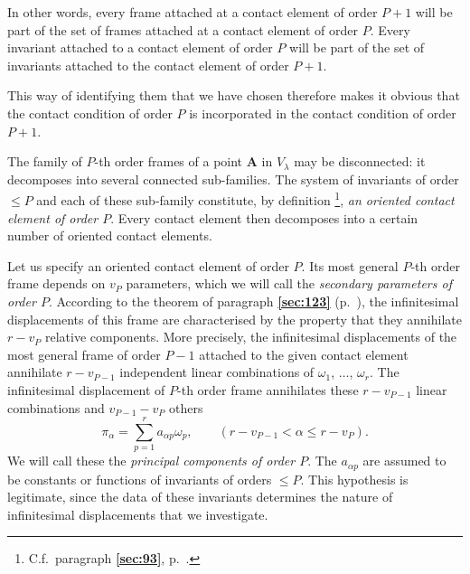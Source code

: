 \documentclass[leqno,11pt]{book}
\numberwithin{equation}{chapter}
\theoremstyle{shape1}
\theoremstyle{shapesmall}
\newcommand{\fsref}[1]{{\rm\textsection\textbf{\ref{sec:#1}}}}
\newcommand{\somespace}{\vspace{9pt}}
\begin{document}
\somespace

{\small
In other words, every frame attached at a contact element of order $P+1$ will be part of the set of frames attached at a contact element of order $P$. Every invariant attached to a contact element of order $P$ will be part of the set of invariants attached to the contact element of order $P+1$.

This way of identifying them that we have chosen therefore makes it obvious that the contact condition of order $P$ is incorporated in the contact condition of order $P+1$.
}

\somespace

The family of $P$-th order frames of a point $\mathbf{A}$ in $V_{\lambda}$ may be disconnected: it decomposes into several connected sub-families. The system of invariants of order $\le P$ and each of these sub-family constitute, by definition \footnote{C.f.~paragraph \fsref{93}, p.~\pageref{sec:93}.}, \emph{an oriented contact element of order $P$}. Every contact element then decomposes into a certain number of oriented contact elements.

Let us specify an oriented contact element of order $P$. Its most general $P$-th order frame depends on $v_{P}$ parameters, which we will call the \emph{secondary parameters of order $P$}. According to the theorem of paragraph \fsref{123} (p.~\pageref{sec:123}), the infinitesimal displacements of this frame are characterised by the property that they annihilate $r-v_{P}$ relative components. More precisely, the infinitesimal displacements of the most general frame of order $P-1$ attached to the given contact element annihilate $r-v_{P-1}$ independent linear combinations of $\omega_{1}$, $\dots$, $\omega_{r}$. The infinitesimal displacement of $P$-th order frame annihilates these $r-v_{P-1}$ linear combinations and $v_{P-1}-v_{P}$ others
\begin{equation}
  \label{eq:10.1}
  \pi_{\alpha}=\sum_{p=1}^{r}a_{\alpha p}\omega_{p},\qquad(r-v_{P-1}<\alpha\le r-v_{P}).
\end{equation}
We will call these the \emph{principal components of order $P$}. The $a_{\alpha p}$ are assumed to be constants or functions of invariants of orders $\le P$. This hypothesis is legitimate, since the data of these invariants determines the nature of infinitesimal displacements that we investigate.
\end{document}
